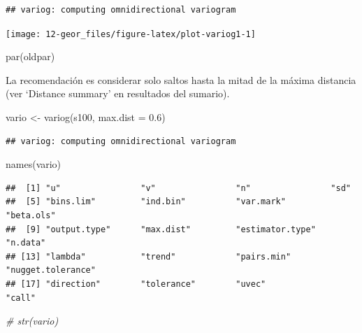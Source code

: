 \documentclass[
  spanish,
]{book}
\newenvironment{Shaded}{\begin{snugshade}}{\end{snugshade}}
\newcommand{\AttributeTok}[1]{\textcolor[rgb]{0.77,0.63,0.00}{#1}}
\newcommand{\CommentTok}[1]{\textcolor[rgb]{0.56,0.35,0.01}{\textit{#1}}}
\newcommand{\FloatTok}[1]{\textcolor[rgb]{0.00,0.00,0.81}{#1}}
\newcommand{\FunctionTok}[1]{\textcolor[rgb]{0.00,0.00,0.00}{#1}}
\newcommand{\NormalTok}[1]{#1}
\newcommand{\OtherTok}[1]{\textcolor[rgb]{0.56,0.35,0.01}{#1}}
\theoremstyle{break}
\theoremstyle{definition}
\theoremstyle{definition}
\theoremstyle{definition}
\theoremstyle{definition}
\theoremstyle{remark}
\begin{document}
\begin{verbatim}
## variog: computing omnidirectional variogram
\end{verbatim}

\begin{center}\texttt{[image: 12-geor\_files/figure-latex/plot-variog1-1]} \end{center}

\begin{Shaded}
\begin{Highlighting}[]
\FunctionTok{par}\NormalTok{(oldpar)}
\end{Highlighting}
\end{Shaded}

La recomendación es considerar solo saltos hasta la mitad de la máxima
distancia (ver `Distance summary' en resultados del sumario).

\begin{Shaded}
\begin{Highlighting}[]
\NormalTok{vario }\OtherTok{\textless{}{-}} \FunctionTok{variog}\NormalTok{(s100, }\AttributeTok{max.dist =} \FloatTok{0.6}\NormalTok{)}
\end{Highlighting}
\end{Shaded}

\begin{verbatim}
## variog: computing omnidirectional variogram
\end{verbatim}

\begin{Shaded}
\begin{Highlighting}[]
\FunctionTok{names}\NormalTok{(vario)}
\end{Highlighting}
\end{Shaded}

\begin{verbatim}
##  [1] "u"                "v"                "n"                "sd"              
##  [5] "bins.lim"         "ind.bin"          "var.mark"         "beta.ols"        
##  [9] "output.type"      "max.dist"         "estimator.type"   "n.data"          
## [13] "lambda"           "trend"            "pairs.min"        "nugget.tolerance"
## [17] "direction"        "tolerance"        "uvec"             "call"
\end{verbatim}

\begin{Shaded}
\begin{Highlighting}[]
\CommentTok{\# str(vario)}
\end{Highlighting}
\end{Shaded}
\end{document}
